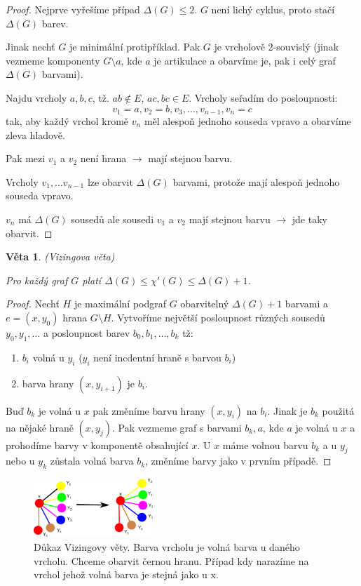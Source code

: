 \documentclass[a4paper,10pt,titlepage]{article} \usepackage[utf8]{inputenc}
\newtheorem{theorem}{Věta}
\begin{document}
\begin{proof}
Nejprve vyřešíme případ $\Delta(G) \leq 2$. $G$ není lichý cyklus, proto stačí $\Delta(G)$ barev.

Jinak nechť $G$ je minimální protipříklad.
Pak $G$ je vrcholově $2$-souvislý
(jinak vezmeme komponenty $G\setminus a$, kde $a$ je artikulace a obarvíme je, pak i celý graf $\Delta(G)$ barvami).

Najdu vrcholy $a,b,c$, tž. $ab \notin E$, $ac, bc \in E$.
Vrcholy seřadím do posloupnosti:
\[
	v_1 = a, v_2 = b, v_3, \ldots ,v_{n-1},v_n = c
\]
tak, aby každý vrchol kromě $v_n$ měl
alespoň jednoho souseda vpravo a obarvíme zleva hladově.

Pak mezi $v_1$ a $v_2$ není hrana $\rightarrow$ mají stejnou barvu.

Vrcholy $v_1, \ldots v_{n-1}$ lze obarvit $\Delta(G)$ barvami, protože mají alespoň jednoho souseda vpravo.

$v_n$ má $\Delta(G)$ sousedů ale sousedi $v_1$ a $v_2$ mají stejnou barvu $\rightarrow$ jde taky obarvit.
\end{proof}


\begin{theorem}
(Vizingova věta)

Pro každý graf $G$ platí $\Delta(G) \leq \chi'(G) \leq \Delta(G) + 1$.
\end{theorem}

\begin{proof}
Nechť $H$ je maximální podgraf $G$ obarvitelný $\Delta(G)+1$ barvami a $e = (x,y_0)$ hrana $G\setminus H$.
Vytvoříme největší posloupnost různých sousedů $y_0, y_1, \ldots$ a posloupnost barev $b_0,b_1, \ldots , b_k$ tž:
\begin{enumerate}
	\item $b_i$ volná u $y_i$ ($y_i$ není incdentní hraně s barvou $b_i$)
	\item barva hrany $(x, y_{i+1})$ je $b_i$.
\end{enumerate}
Buď $b_k$ je volná u $x$ pak změníme barvu hrany $(x,y_i)$ na $b_i$.
Jinak je $b_k$ použitá na nějaké hraně $(x,y_j)$.
Pak vezmeme graf s barvami $b_k, a$, kde $a$ je volná u $x$ a prohodíme barvy v komponentě obsahující $x$.
U $x$ máme volnou barvu $b_k$ a u $y_j$ nebo u $y_k$ zůstala volná barva $b_k$, změníme barvy jako v prvním případě.
\end{proof}

\begin{figure}[h!]
	\centerline{\mbox{\includegraphics[width=0.40\textwidth]{pics/VIZING.eps}}}
	\caption{Důkaz Vizingovy věty. Barva vrcholu je volná barva u daného vrcholu. Chceme obarvit černou hranu.
			Případ kdy narazíme na vrchol jehož volná barva je stejná jako u x.
	} 
	\label{vizing_obr}
\end{figure}
\end{document}
